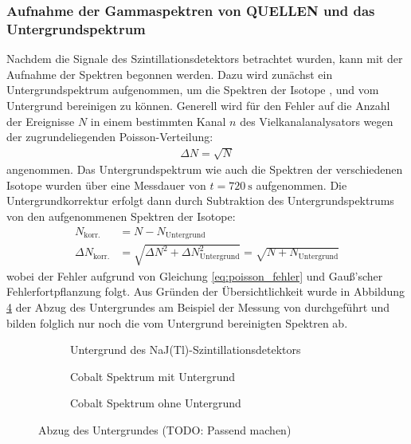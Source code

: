 \documentclass[11pt, a4paper]{article}
\numberwithin{equation}{section}
\begin{document}
\subsubsection{Aufnahme der Gammaspektren von QUELLEN und das Untergrundspektrum}
Nachdem die Signale des Szintillationsdetektors betrachtet wurden, kann mit der Aufnahme der Spektren begonnen werden.
Dazu wird zunächst ein Untergrundspektrum aufgenommen, um die Spektren der Isotope ,  und  vom Untergrund bereinigen zu können.
Generell wird für den Fehler auf die Anzahl der Ereignisse $N$ in einem bestimmten Kanal $n$ des Vielkanalanalysators wegen der zugrundeliegenden Poisson-Verteilung:
\begin{align}
\label{eq:poisson_fehler}
\Delta N = \sqrt{N}
\end{align}
angenommen.
Das Untergrundspektrum wie auch die Spektren der verschiedenen Isotope wurden über eine Messdauer von $t = \SI{720}{\second}$ aufgenommen.
Die Untergrundkorrektur erfolgt dann durch Subtraktion des Untergrundspektrums von den aufgenommenen Spektren der Isotope:
\begin{align}
	\label{eq:untergrundkorr_fehler}
	N_\mathrm{korr.} &= N - N_\mathrm{Untergrund}  \nonumber\\
	\Delta N_\mathrm{korr.} &= \sqrt{\Delta N^2 + \Delta N_\mathrm{Untergrund}^2} = \sqrt{N + N_\mathrm{Untergrund}}
\end{align}
wobei der Fehler aufgrund von Gleichung \ref{eq:poisson_fehler} und Gauß'scher Fehlerfortpflanzung folgt.
Aus Gründen der Übersichtlichkeit wurde in Abbildung \ref{fig:abzug_untergrund} der Abzug des Untergrundes am Beispiel der Messung von  durchgeführt und bilden folglich nur noch die vom Untergrund bereinigten Spektren ab.
\begin{figure}[hp]
	\centering
	\begin{subfigure}[b]{0.7\textwidth}
		\resizebox{!}{0.3\textheight}{
		
		}
		\caption{Untergrund des NaJ(Tl)-Szintillationsdetektors}
		\label{fig:untergrund_szinti}
	\end{subfigure}
	
	\begin{subfigure}[b]{0.7\textwidth}
		\resizebox{!}{0.3\textheight}{
		
		}
		\caption{Cobalt Spektrum mit Untergrund}
		\label{fig:cobalt_mit_untergrund}
	\end{subfigure}
	
	\begin{subfigure}[b]{0.7\textwidth}
		\resizebox{!}{0.3\textheight}{
		
		}
		\caption{Cobalt Spektrum ohne Untergrund}
		\label{fig:cobalt_ohne_untergrund}
	\end{subfigure}
	\caption{Abzug des Untergrundes (TODO: Passend machen)}
	\label{fig:abzug_untergrund}
\end{figure}
\end{document}
